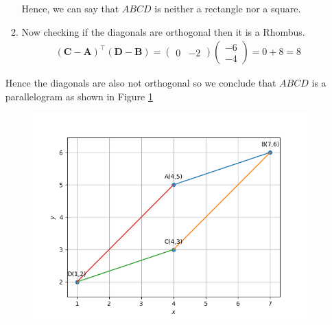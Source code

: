 \documentclass[12pt]{article}
\newcommand{\myvec}[1]{\ensuremath{\begin{pmatrix}#1\end{pmatrix}}}
\let\vec\mathbf
\begin{document}
\begin{enumerate}
\begin{enumerate}
	Hence, we can say that $ABCD$ is neither a rectangle nor a square.

		\item Now checking if the diagonals are orthogonal then it is a Rhombus.
	\begin{align}
		(\vec{C}- \vec{A})^\top (\vec{D}-\vec{B}) = \myvec{0&-2} \myvec{-6\\-4} = 0+8 = 8
	\end{align}
	\end{enumerate}		
	Hence the diagonals are also not orthogonal so we conclude that $ABCD$ is a parallelogram as shown in Figure \ref{fig:Fig3}

\begin{figure}[!h]
	\begin{center} 
	    \includegraphics[width=\columnwidth]{figs/quad3}
	\end{center}
\caption{}
\label{fig:Fig3}
\end{figure}
\end{enumerate}
\end{document}
